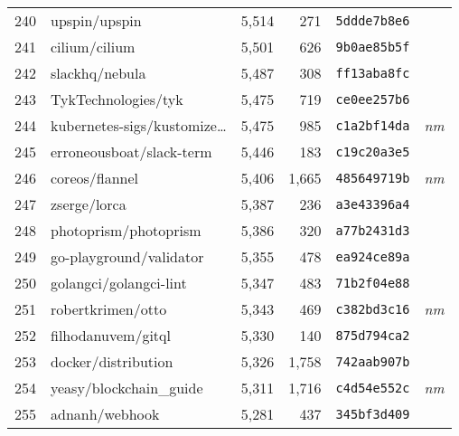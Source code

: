 {\begin{supertabular}{llrrll}
        240 &                      upspin/upspin &  5,514 &    271 &  \texttt{5ddde7b8e6} &              \\
        241 &                      cilium/cilium &  5,501 &    626 &  \texttt{9b0ae85b5f} &              \\
        242 &                     slackhq/nebula &  5,487 &    308 &  \texttt{ff13aba8fc} &              \\
        243 &                TykTechnologies/tyk &  5,475 &    719 &  \texttt{ce0ee257b6} &              \\
        244 &    kubernetes-sigs/kustomize\ldots &  5,475 &    985 &  \texttt{c1a2bf14da} &  \textit{nm} \\
        245 &           erroneousboat/slack-term &  5,446 &    183 &  \texttt{c19c20a3e5} &              \\
        246 &                     coreos/flannel &  5,406 &  1,665 &  \texttt{485649719b} &  \textit{nm} \\
        247 &                       zserge/lorca &  5,387 &    236 &  \texttt{a3e43396a4} &              \\
        248 &              photoprism/photoprism &  5,386 &    320 &  \texttt{a77b2431d3} &              \\
        249 &            go-playground/validator &  5,355 &    478 &  \texttt{ea924ce89a} &              \\
        250 &             golangci/golangci-lint &  5,347 &    483 &  \texttt{71b2f04e88} &              \\
        251 &                  robertkrimen/otto &  5,343 &    469 &  \texttt{c382bd3c16} &  \textit{nm} \\
        252 &                 filhodanuvem/gitql &  5,330 &    140 &  \texttt{875d794ca2} &              \\
        253 &                docker/distribution &  5,326 &  1,758 &  \texttt{742aab907b} &              \\
        254 &            yeasy/blockchain\_guide &  5,311 &  1,716 &  \texttt{c4d54e552c} &  \textit{nm} \\
        255 &                     adnanh/webhook &  5,281 &    437 &  \texttt{345bf3d409} &              \\

\end{supertabular}}

